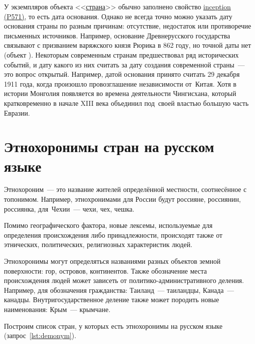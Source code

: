     У экземпляров объекта <<\href{https://www.wikidata.org/wiki/Q6256}{страна}>> обычно заполнено свойство \href{https://www.wikidata.org/wiki/Property:P571}{inception (P571)}, то есть дата основания. Однако не всегда точно можно  указать дату основания страны по разным причинам: отсутствие, недостаток или противоречие письменных источников. Например, основание Древнерусского государства связывают с призванием варяжского князя Рюрика в 862 году, но точной даты нет (объект ). 
Некоторым современным странам предшествовал ряд исторических событий, 
и дату какого из них считать за дату создания современной страны~--- это вопрос открытый. 
Например, датой основания  принято считать 29 декабря 1911 года, 
когда произошло провозглашение независимости от~Китая. 
Хотя в истории Монголия появляется во времена деятельности Чингисхана, 
который кратковременно в начале XIII 
века объединил под~своей властью большую часть Евразии.



\section{Этнохоронимы стран на русском языке}

Этнохороним~--- это название жителей определённой местности, соотнесённое с топонимом. 
Например, этнохронимами для России будут россияне, россиянин, россиянка, 
для~Чехии~--- чехи, чех, чешка.

Помимо географического фактора, новые лексемы, 
    используемые для определения происхождения либо принадлежности, 
    происходят также от этнических, политических, религиозных характеристик людей\autocite{Zhuravleva2012}. 

Этнохоронимы могут определяться названиями разных объектов земной поверхности: 
    гор, островов, континентов. 
    Также обозначение места происхождения людей может зависеть от политико-административного деления. 
    Например, для обозначения гражданства: Таиланд~--- таиландцы, Канада~--- канадцы. 
    Внутригосударственное деление также может породить новые наименования: Крым~--- крымчане.



\newpage
Построим список стран, у которых есть этнохоронимы на русском языке (запрос~\ref{lst:demonym}).


